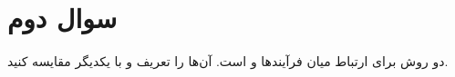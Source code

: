 \section{سوال دوم}

دو روش برای ارتباط میان فرآیندها  و  است. آن‌ها را تعریف و با یکدیگر مقایسه کنید.

\begin{qsolve}
	
\end{qsolve}